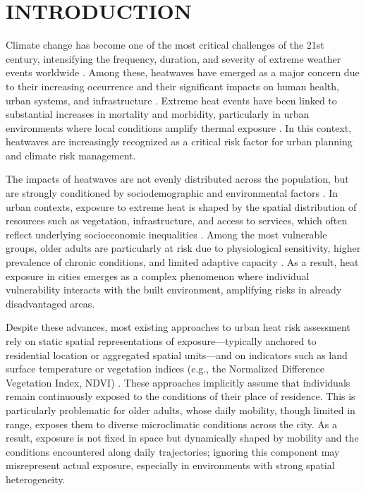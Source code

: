 \documentclass{wscpaperproc}
\theoremstyle{wsc}
\begin{document}
\section{INTRODUCTION}
\label{sec:intro}

Climate change has become one of the most critical challenges of the 21st century, intensifying the frequency, duration, and severity of extreme weather events worldwide \cite{moore2024precipitation}. Among these, heatwaves have emerged as a major concern due to their increasing occurrence and their significant impacts on human health, urban systems, and infrastructure \cite{luber2008heat}. 
Extreme heat events have been linked to substantial increases in mortality and morbidity, particularly in urban environments where local conditions amplify thermal exposure \cite{barriopedro2023heatwaves}. In this context, heatwaves are increasingly recognized as a critical risk factor for urban planning and climate risk management.

The impacts of heatwaves are not evenly distributed across the population, but are strongly conditioned by sociodemographic and environmental factors \cite{wilhelmi2010framework}. In urban contexts, exposure to extreme heat is shaped by the spatial distribution of resources such as vegetation, infrastructure, and access to services, which often reflect underlying socioeconomic inequalities \cite{schwaab2021urban}. Among the most vulnerable groups, older adults are particularly at risk due to physiological sensitivity, higher prevalence of chronic conditions, and limited adaptive capacity \cite{arsad2022heatwaves}. As a result, heat exposure in cities emerges as a complex phenomenon where individual vulnerability interacts with the built environment, amplifying risks in already disadvantaged areas.

Despite these advances, most existing approaches to urban heat risk assessment rely on static spatial representations of exposure—typically anchored to residential location or aggregated spatial units—and on indicators such as land surface temperature or vegetation indices (e.g., the Normalized Difference Vegetation Index, NDVI) \cite{buscail2012heatwave,niu2021heat}. These approaches implicitly assume that individuals remain continuously exposed to the conditions of their place of residence. This is particularly problematic for older adults, whose daily mobility, though limited in range, exposes them to diverse microclimatic conditions across the city. As a result, exposure is not fixed in space but dynamically shaped by mobility and the conditions encountered along daily trajectories; ignoring this component may misrepresent actual exposure, especially in environments with strong spatial heterogeneity.
\end{document}
